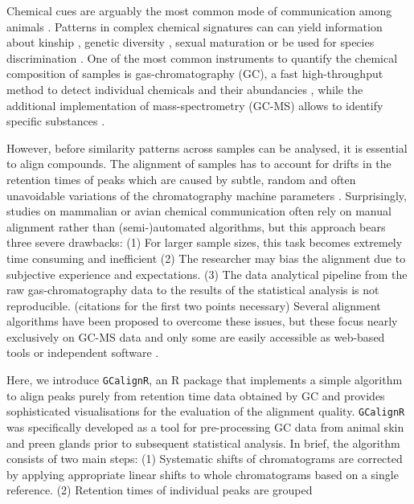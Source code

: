 Chemical cues are arguably the most common mode of communication among
animals \citep{Wyatt.2014}. Patterns in complex chemical signatures can
can yield information about kinship \citep{Krause.2012, Stoffel.2015},
genetic diversity \citep{Charpentier.2010, Leclaire.2012}, sexual
maturation \citep{Caspers.2011} or be used for species discrimination
\citep{Meulemeester.2011}. One of the most common instruments to
quantify the chemical composition of samples is gas-chromatography (GC),
a fast high-throughput method to detect individual chemicals and their
abundancies \citep{McNair.2011}, while the additional implementation of
mass-spectrometry (GC-MS) allows to identify specific substances
\citep{Caspers.2011}. \par
However, before similarity patterns across samples can be analysed, it
is essential to align compounds. The alignment of samples has to account
for drifts in the retention times of peaks which are caused by subtle,
random and often unavoidable variations of the chromatography machine
parameters \citep{Pierce.2005}. Surprisingly, studies on mammalian or
avian chemical communication often rely on manual alignment rather than
(semi-)automated algorithms, but this approach bears three severe
drawbacks: (1) For larger sample sizes, this task becomes extremely time
consuming and inefficient (2) The researcher may bias the alignment due
to subjective experience and expectations. (3) The data analytical
pipeline from the raw gas-chromatography data to the results of the
statistical analysis is not reproducible. (citations for the first two
points necessary) Several alignment algorithms have been proposed to
overcome these issues, but these focus nearly exclusively on GC-MS data
\citep{Pierce.2005, Robinson.2007,Jiang.2013} and only some are easily
accessible as web-based tools \citep{Hoffmann.2009, Wang.2010} or
independent software \citep{Dellicour.2013}. \par
Here, we introduce \texttt{GCalignR}, an R package that implements a
simple algorithm to align peaks purely from retention time data obtained
by GC and provides sophisticated visualisations for the evaluation of
the alignment quality. \texttt{GCalignR} was specifically developed as a
tool for pre-processing GC data from animal skin and preen glands prior
to subsequent statistical analysis. In brief, the algorithm consists of
two main steps: (1) Systematic shifts of chromatograms are corrected by
applying appropriate linear shifts to whole chromatograms based on a
single reference. (2) Retention times of individual peaks are grouped
